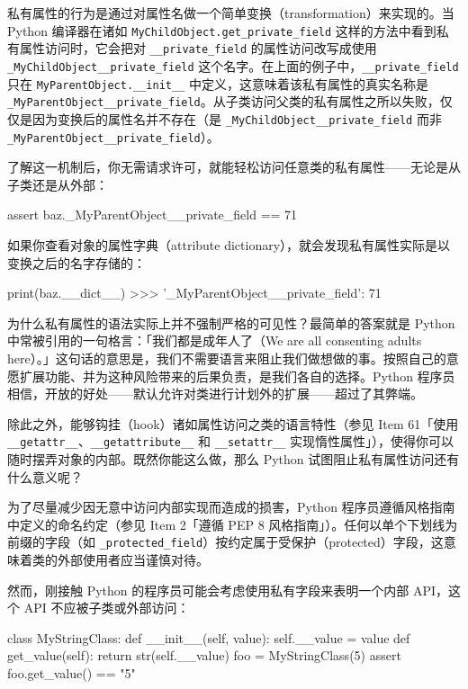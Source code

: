 私有属性的行为是通过对属性名做一个简单变换（transformation）来实现的。当 Python 编译器在诸如 \texttt{MyChildObject.get\_private\_field} 这样的方法中看到私有属性访问时，它会把对 \texttt{\_\_private\_field} 的属性访问改写成使用 \texttt{\_MyChildObject\_\_private\_field} 这个名字。在上面的例子中，\texttt{\_\_private\_field} 只在 \texttt{MyParentObject.\_\_init\_\_} 中定义，这意味着该私有属性的真实名称是 \texttt{\_MyParentObject\_\_private\_field}。从子类访问父类的私有属性之所以失败，仅仅是因为变换后的属性名并不存在（是 \texttt{\_MyChildObject\_\_private\_field} 而非 \texttt{\_MyParentObject\_\_private\_field}）。

了解这一机制后，你无需请求许可，就能轻松访问任意类的私有属性——无论是从子类还是从外部：

\begin{codebox}[python]
assert baz._MyParentObject__private_field == 71
\end{codebox}

如果你查看对象的属性字典（attribute dictionary），就会发现私有属性实际是以变换之后的名字存储的：

\begin{codebox}[python]
print(baz.__dict__)
>>>
{'_MyParentObject__private_field': 71}
\end{codebox}

为什么私有属性的语法实际上并不强制严格的可见性？最简单的答案就是 Python 中常被引用的一句格言：「我们都是成年人了（We are all consenting adults here）。」这句话的意思是，我们不需要语言来阻止我们做想做的事。按照自己的意愿扩展功能、并为这种风险带来的后果负责，是我们各自的选择。Python 程序员相信，开放的好处——默认允许对类进行计划外的扩展——超过了其弊端。

除此之外，能够钩挂（hook）诸如属性访问之类的语言特性（参见 Item 61「使用 \texttt{\_\_getattr\_\_}、\texttt{\_\_getattribute\_\_} 和 \texttt{\_\_setattr\_\_} 实现惰性属性」），使得你可以随时摆弄对象的内部。既然你能这么做，那么 Python 试图阻止私有属性访问还有什么意义呢？

为了尽量减少因无意中访问内部实现而造成的损害，Python 程序员遵循风格指南中定义的命名约定（参见 Item 2「遵循 PEP 8 风格指南」）。任何以单个下划线为前缀的字段（如 \texttt{\_protected\_field}）按约定属于受保护（protected）字段，这意味着类的外部使用者应当谨慎对待。

然而，刚接触 Python 的程序员可能会考虑使用私有字段来表明一个内部 API，这个 API 不应被子类或外部访问：

\begin{codebox}[python]
class MyStringClass:
    def __init__(self, value):
        self.__value = value
    def get_value(self):
        return str(self.__value)
foo = MyStringClass(5)
assert foo.get_value() == "5"
\end{codebox}


